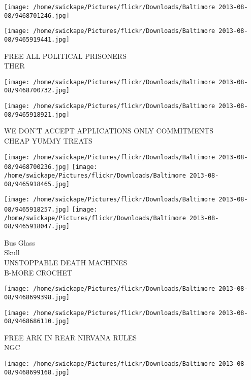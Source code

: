 \documentclass[10pt,letterpaper]{article}
\begin{document}
\texttt{[image: /home/swickape/Pictures/flickr/Downloads/Baltimore 2013-08-08/9468701246.jpg]}

\vspace{0.25in}
\texttt{[image: /home/swickape/Pictures/flickr/Downloads/Baltimore 2013-08-08/9465919441.jpg]}

FREE ALL POLITICAL PRISONERS\\
THER\\
\pagebreak

\texttt{[image: /home/swickape/Pictures/flickr/Downloads/Baltimore 2013-08-08/9468700732.jpg]}

\vspace{0.25in}
\texttt{[image: /home/swickape/Pictures/flickr/Downloads/Baltimore 2013-08-08/9465918921.jpg]}

WE DON'T ACCEPT APPLICATIONS ONLY COMMITMENTS\\
CHEAP YUMMY TREATS\\
\pagebreak

\texttt{[image: /home/swickape/Pictures/flickr/Downloads/Baltimore 2013-08-08/9468700236.jpg]}
\texttt{[image: /home/swickape/Pictures/flickr/Downloads/Baltimore 2013-08-08/9465918465.jpg]}

\texttt{[image: /home/swickape/Pictures/flickr/Downloads/Baltimore 2013-08-08/9465918257.jpg]}
\texttt{[image: /home/swickape/Pictures/flickr/Downloads/Baltimore 2013-08-08/9465918047.jpg]}

Bus Glass\\
Skull\\
UNSTOPPABLE DEATH MACHINES\\
B{-}MORE CROCHET\\
\pagebreak

\texttt{[image: /home/swickape/Pictures/flickr/Downloads/Baltimore 2013-08-08/9468699398.jpg]}

\vspace{0.25in}
\texttt{[image: /home/swickape/Pictures/flickr/Downloads/Baltimore 2013-08-08/9468686110.jpg]}

FREE ARK IN REAR NIRVANA RULES\\
NGC\\
\pagebreak

\texttt{[image: /home/swickape/Pictures/flickr/Downloads/Baltimore 2013-08-08/9468699168.jpg]}
\end{document}
